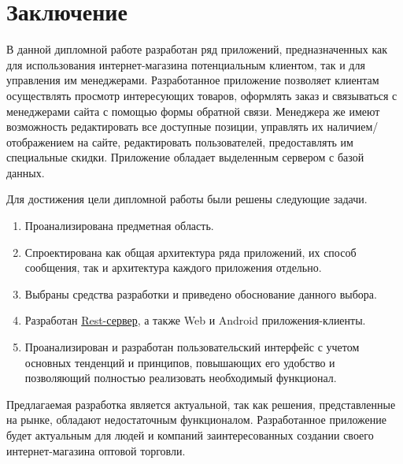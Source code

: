 \section{Заключение}\label{sec:closing}\indent

В данной дипломной работе разработан ряд приложений, предназначенных как для использования интернет-магазина потенциальным клиентом, так и для управления им менеджерами.
Разработанное приложение позволяет клиентам осуществлять просмотр интересующих товаров, оформлять заказ и связываться с менеджерами сайта с помощью формы обратной связи.
Менеджера же имеют возможность редактировать все доступные позиции, управлять их наличием/отображением на сайте, редактировать пользователей, предоставлять им специальные скидки.
Приложение обладает выделенным сервером с базой данных.

Для достижения цели дипломной работы были решены следующие задачи.
\begin{enumerate}
    \item Проанализирована предметная область.
    \item Спроектирована как общая архитектура ряда приложений, их способ сообщения, так и архитектура каждого приложения отдельно.
    \item Выбраны средства разработки и приведено обоснование данного выбора.
    \item Разработан \hyperlink{gloss:rest}{Rest-сервер}, а также Web и Android приложения-клиенты.
    \item Проанализирован и разработан пользовательский интерфейс с учетом основных тенденций и принципов, повышающих его удобство и позволяющий полностью реализовать необходимый функционал.
\end{enumerate}

Предлагаемая разработка является актуальной, так как решения, представленные на рынке, обладают недостаточным функционалом.
Разработанное приложение будет актуальным для людей и компаний заинтересованных создании своего интернет-магазина оптовой торговли.
